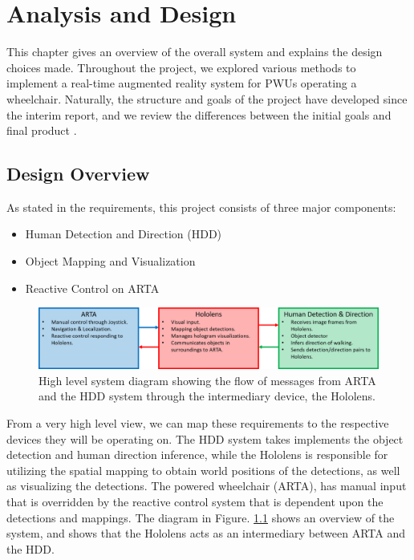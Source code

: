 \chapter{Analysis and Design} \label{chapter:4}
This chapter gives an overview of the overall system and explains the design choices made. Throughout the project, we explored various methods to implement a real-time augmented reality system for PWUs operating a wheelchair. Naturally, the structure and goals of the project have developed since the interim report, and we review the differences between the initial goals and final product .

\section{Design Overview}
As stated in the requirements, this project consists of three major components:
\begin{itemize}
	\item Human Detection and Direction (HDD)
	\item Object Mapping and Visualization
	\item Reactive Control on ARTA
\end{itemize}

\begin{figure}[ht]
	\centering
	\includegraphics[width=1.0\linewidth]{img/chapter4_analysis/simpleSystemDiagram.png}
	\caption{High level system diagram showing the flow of messages from ARTA and the HDD system through the intermediary device, the Hololens.}
	\label{fig:simplifiedHL}
\end{figure}

From a very high level view, we can map these requirements to the respective devices they will be operating on. The HDD system takes implements the object detection and human direction inference, while the Hololens is responsible for utilizing the spatial mapping to obtain world positions of the detections, as well as visualizing the detections. The powered wheelchair (ARTA), has manual input that is overridden by the reactive control system that is dependent upon the detections and mappings. The diagram in Figure. \ref{fig:simplifiedHL} shows an overview of the system, and shows that the Hololens acts as an intermediary between ARTA and the HDD.

